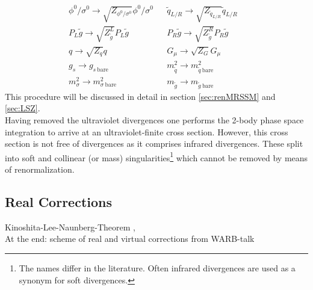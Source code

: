 \begin{align}
& \phi^0 / \sigma^0 \to \sqrt{Z_{\phi^0 / \sigma^0}}\phi^0 / \sigma^0 && \tilde{q}_{L/R} \to \sqrt{Z_{\tilde{q}_{L/R}}}\tilde{q}_{L/R}\nonumber\\
& P_L \tilde{g} \to \sqrt{Z_{\tilde{g}}^L} P_L \tilde{g} && P_R \tilde{g} \to \sqrt{Z_{\tilde{g}}^R} P_R \tilde{g}\nonumber\\
& q \to \sqrt{Z_q}q && G_\mu \to \sqrt{Z_G} G_\mu && \\
& g_s \to g_{s\ \mathrm{bare}} && m_{\tilde{q}}^2 \to m_{\tilde{q}\ \mathrm{bare}}^2\nonumber\\
&  m_{\sigma}^2 \to m_{\sigma\ \mathrm{bare}}^2 && m_{\tilde{g}} \to m_{\tilde{g}\ \mathrm{bare}}
\end{align}
This procedure will be discussed in detail in section \ref{sec:renMRSSM} and \ref{sec:LSZ}.\\
Having removed the ultraviolet divergences one performs the 2-body phase space integration to arrive at an ultraviolet-finite cross section. However, this cross section is not free of divergences as it comprises infrared divergences. These split into soft and collinear (or mass) singularities\footnote{The names differ in the literature. Often infrared divergences are used as a synonym for soft divergences.} which cannot be removed by means of renormalization.


\subsection{Real Corrections}
Kinoshita-Lee-Naunberg-Theorem \cite{1962JMP.....3..650K},\cite{PhysRev.133.B1549}\\
At the end: scheme of real and virtual corrections from WARB-talk